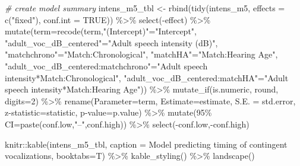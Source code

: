 \documentclass[
]{article}
\newenvironment{Shaded}{\begin{snugshade}}{\end{snugshade}}
\newcommand{\AttributeTok}[1]{\textcolor[rgb]{0.77,0.63,0.00}{#1}}
\newcommand{\CommentTok}[1]{\textcolor[rgb]{0.56,0.35,0.01}{\textit{#1}}}
\newcommand{\ConstantTok}[1]{\textcolor[rgb]{0.00,0.00,0.00}{#1}}
\newcommand{\DecValTok}[1]{\textcolor[rgb]{0.00,0.00,0.81}{#1}}
\newcommand{\FunctionTok}[1]{\textcolor[rgb]{0.00,0.00,0.00}{#1}}
\newcommand{\NormalTok}[1]{#1}
\newcommand{\OtherTok}[1]{\textcolor[rgb]{0.56,0.35,0.01}{#1}}
\newcommand{\SpecialCharTok}[1]{\textcolor[rgb]{0.00,0.00,0.00}{#1}}
\newcommand{\StringTok}[1]{\textcolor[rgb]{0.31,0.60,0.02}{#1}}
\begin{document}
\begin{Shaded}
\begin{Highlighting}[]
\CommentTok{\# create model summary}
\NormalTok{intens\_m5\_tbl }\OtherTok{\textless{}{-}} \FunctionTok{rbind}\NormalTok{(}\FunctionTok{tidy}\NormalTok{(intens\_m5,}
                         \AttributeTok{effects =} \FunctionTok{c}\NormalTok{(}\StringTok{"fixed"}\NormalTok{),}
                         \AttributeTok{conf.int =} \ConstantTok{TRUE}\NormalTok{)) }\SpecialCharTok{\%\textgreater{}\%}
  \FunctionTok{select}\NormalTok{(}\SpecialCharTok{{-}}\NormalTok{effect) }\SpecialCharTok{\%\textgreater{}\%}
  \FunctionTok{mutate}\NormalTok{(}\AttributeTok{term=}\FunctionTok{recode}\NormalTok{(term,}\StringTok{"(Intercept)"}\OtherTok{=}\StringTok{"Intercept"}\NormalTok{,}
                     \StringTok{"adult\_voc\_dB\_centered"}\OtherTok{=}\StringTok{"Adult speech intensity (dB)"}\NormalTok{,}
                     \StringTok{"matchchrono"}\OtherTok{=}\StringTok{"Match:Chronological"}\NormalTok{,}
                     \StringTok{"matchHA"}\OtherTok{=}\StringTok{"Match:Hearing Age"}\NormalTok{,}
                     \StringTok{"adult\_voc\_dB\_centered:matchchrono"}\OtherTok{=}\StringTok{"Adult speech intensity*Match:Chronological"}\NormalTok{,}
                     \StringTok{"adult\_voc\_dB\_centered:matchHA"}\OtherTok{=}\StringTok{"Adult speech intensity*Match:Hearing Age"}\NormalTok{)) }\SpecialCharTok{\%\textgreater{}\%}
  \FunctionTok{mutate\_if}\NormalTok{(is.numeric, round, }\AttributeTok{digits=}\DecValTok{2}\NormalTok{) }\SpecialCharTok{\%\textgreater{}\%}
  \FunctionTok{rename}\NormalTok{(}\AttributeTok{Parameter=}\NormalTok{term,}
         \AttributeTok{Estimate=}\NormalTok{estimate,}
         \AttributeTok{S.E. =}\NormalTok{ std.error,}
         \StringTok{\textasciigrave{}}\AttributeTok{z{-}statistic}\StringTok{\textasciigrave{}}\OtherTok{=}\NormalTok{statistic,}
         \StringTok{\textasciigrave{}}\AttributeTok{p{-}value}\StringTok{\textasciigrave{}}\OtherTok{=}\NormalTok{p.value) }\SpecialCharTok{\%\textgreater{}\%}
  \FunctionTok{mutate}\NormalTok{(}\StringTok{\textasciigrave{}}\AttributeTok{95\% CI}\StringTok{\textasciigrave{}}\OtherTok{=}\FunctionTok{paste}\NormalTok{(conf.low,}\StringTok{"–"}\NormalTok{,conf.high)) }\SpecialCharTok{\%\textgreater{}\%}
  \FunctionTok{select}\NormalTok{(}\SpecialCharTok{{-}}\NormalTok{conf.low,}\SpecialCharTok{{-}}\NormalTok{conf.high)}

\NormalTok{knitr}\SpecialCharTok{::}\FunctionTok{kable}\NormalTok{(intens\_m5\_tbl,}
             \AttributeTok{caption =} \StringTok{\textquotesingle{}Model predicting timing of contingent vocalizations\textquotesingle{}}\NormalTok{,}
             \AttributeTok{booktabs=}\NormalTok{T) }\SpecialCharTok{\%\textgreater{}\%}
  \FunctionTok{kable\_styling}\NormalTok{() }\SpecialCharTok{\%\textgreater{}\%}
  \FunctionTok{landscape}\NormalTok{()}
\end{Highlighting}
\end{Shaded}
\end{document}

